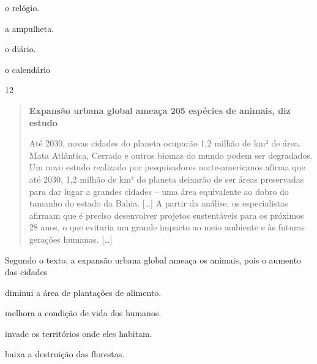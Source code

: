 \begin{minipage}{.5\textwidth}
\begin{escolha}
\item o relógio.

\item a ampulheta.

\item o diário.

\item o calendário
\end{escolha}
\end{minipage}


\num{12}

\begin{quote}
\textbf{Expansão urbana global ameaça 205 espécies de animais, diz estudo}

Até 2030, novas cidades do planeta ocuparão 1,2 milhão de km² de área.
Mata Atlântica, Cerrado e outros biomas do mundo podem ser degradados.
Um novo estudo realizado por pesquisadores norte-americanos afirma que
até 2030, 1,2 milhão de km² do planeta deixarão de ser áreas preservadas
para dar lugar a grandes cidades – uma área equivalente ao dobro do
tamanho do estado da Bahia. {[}\ldots{}{]}
A partir da análise, os especialistas
afirmam que é preciso desenvolver projetos sustentáveis para os próximos
28 anos, o que evitaria um grande impacto ao meio ambiente e às futuras
gerações humanas. {[}\ldots{}{]}

\end{quote}

\noindent{}Segundo o texto, a expansão urbana global ameaça os animais, pois o
aumento das cidades

\begin{escolha}
\item diminui a área de plantações de alimento.

\item melhora a condição de vida dos humanos.

\item invade os territórios onde eles habitam.

\item baixa a destruição das florestas.
\end{escolha}

